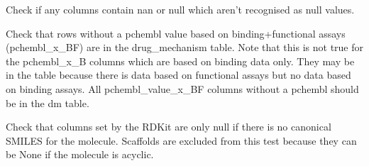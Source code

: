 \documentclass[letterpaper,10pt,english]{sphinxmanual}
\begin{document}

\begin{fulllineitems}
\label{\detokenize{sanity_checks:sanity_checks.check_null_values}}
\pysigstartsignatures
{}
\pysigstopsignatures
\sphinxAtStartPar
Check if any columns contain nan or null which aren’t recognised as null values.

\end{fulllineitems}


\begin{fulllineitems}
\label{\detokenize{sanity_checks:sanity_checks.check_pairs_without_pchembl_are_in_drug_mechanisms}}
\pysigstartsignatures
{}
\pysigstopsignatures
\sphinxAtStartPar
Check that rows without a pchembl value based on binding+functional assays (pchembl\_x\_BF)
are in the drug\_mechanism table.
Note that this is not true for the pchembl\_x\_B columns which are based on binding data only.
They may be in the table because there is data based on functional assays
but no data based on binding assays.
All pchembl\_value\_x\_BF columns without a pchembl should be in the dm table.

\end{fulllineitems}


\begin{fulllineitems}
\label{\detokenize{sanity_checks:sanity_checks.check_rdkit_props}}
\pysigstartsignatures
{}
\pysigstopsignatures
\sphinxAtStartPar
Check that columns set by the RDKit are only null
if there is no canonical SMILES for the molecule.
Scaffolds are excluded from this test because
they can be None if the molecule is acyclic.

\end{fulllineitems}
\end{document}
